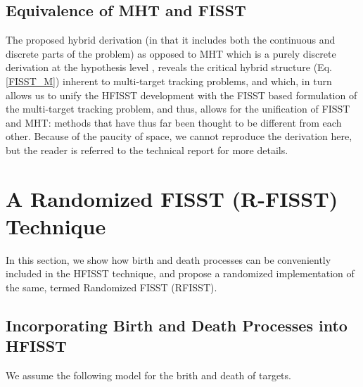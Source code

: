 \documentclass[10pt, conference]{IEEEtran}
\begin{document}
\subsection{Equivalence of MHT and FISST}
The proposed hybrid derivation (in that it includes both the continuous and discrete parts of the problem) as opposed to MHT which is a purely discrete derivation at the hypothesis level \cite{HOMHT},  reveals the critical hybrid structure (Eq. \ref{FISST_M}) inherent to  multi-target tracking problems, and which, in turn  allows us to unify the HFISST development with the FISST based formulation of the multi-target tracking problem, and thus, allows for the unification of FISST and MHT: methods that have thus far been thought to be different from each other. Because of the paucity of space, we cannot reproduce the derivation here, but the reader is referred to the technical report \cite{HFISST_journal} for more details.




















\section{A Randomized FISST (R-FISST) Technique}
In this section, we show how birth and death processes can be conveniently included in the HFISST technique, and propose a randomized implementation of the same, termed Randomized FISST (RFISST).

\subsection{Incorporating Birth and Death Processes into HFISST}
We assume the following model for the brith and death of targets. 
\end{document}
